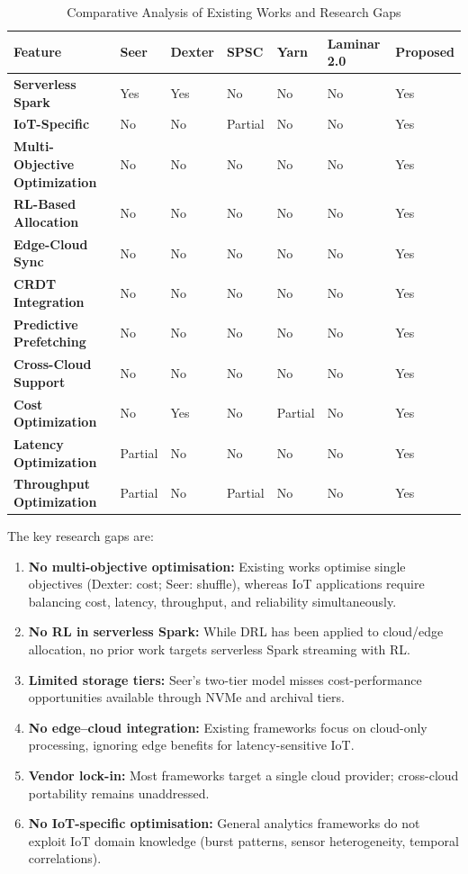 \begin{table}[htbp]
\centering
\caption{Comparative Analysis of Existing Works and Research Gaps}
\label{tab:literature_gaps}
\small
\begin{tabular}{|p{2.5cm}|p{1.5cm}|p{1.5cm}|p{1.5cm}|p{1.5cm}|p{1.5cm}|p{1.6cm}|}
\hline
\textbf{Feature} & \textbf{Seer} & \textbf{Dexter} & \textbf{SPSC} & \textbf{Yarn} & \textbf{Laminar 2.0} & \textbf{Proposed} \\
\hline
\textbf{Serverless Spark} & Yes & Yes & No & No & No & Yes \\
\hline
\textbf{IoT-Specific} & No & No & Partial & No & No & Yes \\
\hline
\textbf{Multi-Objective Optimization} & No & No & No & No & No & Yes \\
\hline
\textbf{RL-Based Allocation} & No & No & No & No & No & Yes \\
\hline
\textbf{Edge-Cloud Sync} & No & No & No & No & No & Yes \\
\hline
\textbf{CRDT Integration} & No & No & No & No & No & Yes \\
\hline
\textbf{Predictive Prefetching} & No & No & No & No & No & Yes \\
\hline
\textbf{Cross-Cloud Support} & No & No & No & No & No & Yes \\
\hline
\textbf{Cost Optimization} & No & Yes & No & Partial & No & Yes \\
\hline
\textbf{Latency Optimization} & Partial & No & No & No & No & Yes \\
\hline
\textbf{Throughput Optimization} & Partial & No & Partial & No & No & Yes \\
\hline
\end{tabular}
\end{table}

\noindent The key research gaps are:
\begin{enumerate}
  \item \textbf{No multi-objective optimisation:} Existing works optimise single
        objectives (Dexter: cost; Seer: shuffle), whereas IoT applications require
        balancing cost, latency, throughput, and reliability simultaneously.
  \item \textbf{No RL in serverless Spark:} While DRL has been applied to cloud/edge
        allocation, no prior work targets serverless Spark streaming with RL.
  \item \textbf{Limited storage tiers:} Seer's two-tier model misses cost-performance
        opportunities available through NVMe and archival tiers.
  \item \textbf{No edge--cloud integration:} Existing frameworks focus on cloud-only
        processing, ignoring edge benefits for latency-sensitive IoT.
  \item \textbf{Vendor lock-in:} Most frameworks target a single cloud provider;
        cross-cloud portability remains unaddressed.
  \item \textbf{No IoT-specific optimisation:} General analytics frameworks do not
        exploit IoT domain knowledge (burst patterns, sensor heterogeneity, temporal
        correlations).
\end{enumerate}

